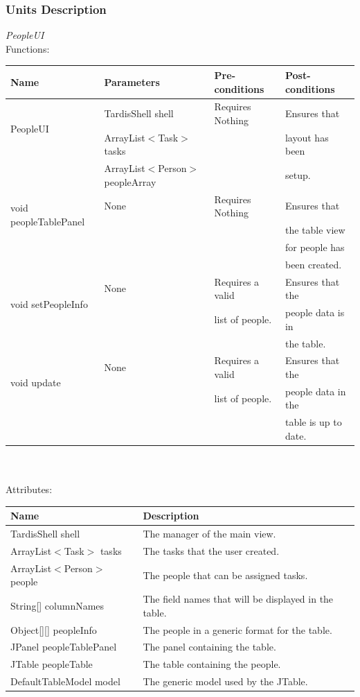 \subsubsection{Units Description}
\emph{PeopleUI}\\
Functions:\\
\begin{tabular}{| l | l | l | l |}
\hline
Name & Parameters & Pre-conditions & Post-conditions\\
\hline
\multirow{2}{*}{PeopleUI}{} & TardisShell shell & Requires Nothing & Ensures that\\ 
			        & ArrayList$<$Task$>$ tasks & & layout has been\\ 
                                            & ArrayList$<$Person$>$ peopleArray & &  setup.
\\
\hline
\multirow{2}{*}{void peopleTablePanel} & None & Requires Nothing & Ensures that\\
& & & the table view\\
& & & for people has\\
& & & been created.
\\
\hline
\multirow{2}{*}{void setPeopleInfo} & None & Requires a valid & Ensures that the\\
		 		            &          & list of people.     & people data is in\\
                                                            &         &                             & the table.
\\
\hline
\multirow{2}{*}{void update} & None & Requires a valid & Ensures that the\\
		                 &          & list of people.     & people data in the\\
		                 &          &                            & table is up to date.
\\
\hline
\end{tabular}\\
\\
Attributes:\\
\begin{tabular}{| l | l |}
\hline
Name & Description\\
\hline
TardisShell shell & The manager of the main view.\\
\hline
ArrayList$<$Task$>$ tasks & The tasks that the user created.\\
\hline
ArrayList$<$Person$>$ people & The people that can be assigned tasks.\\
\hline
String[] columnNames & The field names that will be displayed in the table.\\
\hline
Object[][] peopleInfo & The people in a generic format for the table.\\
\hline
JPanel peopleTablePanel & The panel containing the table.\\
\hline
JTable peopleTable & The table containing the people.\\
\hline
DefaultTableModel model & The generic model used by the JTable.\\
\hline
\end{tabular}

